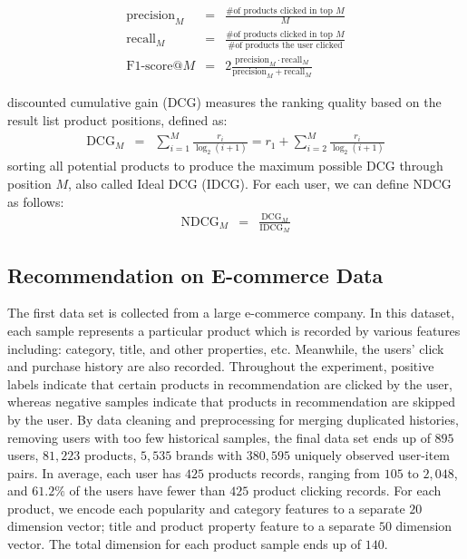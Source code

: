 \begin{eqnarray}
\text{precision}_M & = & \frac{\text{\# of products clicked in top }M}{M} \nonumber \\
\text{recall}_M & = & \frac{\text{\# of products clicked in top }M}{\text{\# of products the user clicked}} \nonumber\\
\text{F1-score@} M & = & 2\frac{\text{precision}_M\cdot \text{recall}_M}{\text{precision}_M + \text{recall}_M} \nonumber
\end{eqnarray}

discounted cumulative gain (DCG) measures the ranking quality based on the result list product positions, defined as:
\begin{eqnarray}
\text{DCG}_M & = & \sum_{i=1}^M\frac{r_i}{\log_2(i+1)} =  r_1 + \sum_{i=2}^M\frac{r_i}{\log_2(i+1)}\nonumber
\end{eqnarray}
sorting all potential products to produce the maximum possible DCG through position $M$, also called Ideal DCG (IDCG).  For each user, we can define NDCG as follows:
\begin{eqnarray}
\text{NDCG}_M & = & \frac{\text{DCG}_M}{\text{IDCG}_M}\nonumber
\end{eqnarray}

\subsection{Recommendation on E-commerce Data}
The first data set is collected from a large e-commerce company.  In this dataset, each sample represents a particular product which is recorded by various features including: category, title, and other properties, etc.  Meanwhile, the users' click and purchase history are also recorded. Throughout the experiment, positive labels indicate that certain products in recommendation are clicked by the user, whereas negative samples indicate that products in recommendation are skipped by the user.  By data cleaning and preprocessing for merging duplicated histories, removing users with too few historical samples, the final data set ends up of $895$ users, $81,223$ products, $5,535$ brands with $380,595$ uniquely observed user-item pairs.  In average, each user has $425$ products records, ranging from $105$ to $2,048$, and $61.2\%$ of the users have fewer than $425$ product clicking records.  For each product, we encode each popularity and category features to a separate $20$ dimension vector; title and product property feature to a separate $50$ dimension vector.   The total dimension for each product sample ends up of $140$.

